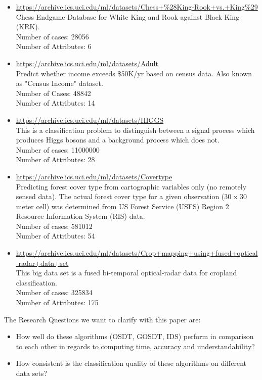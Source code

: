 \documentclass[preprint,a4paper]{sig-alternate-xt}
\begin{document}
\begin{itemize}
    \item \url{https://archive.ics.uci.edu/ml/datasets/Chess+\%28King-Rook+vs.+King\%29}\\
    Chess Endgame Database for White King and Rook against Black King (KRK).\\
    Number of cases: 28056\\
    Number of Attributes: 6
    \item \url{https://archive.ics.uci.edu/ml/datasets/Adult}\\
    Predict whether income exceeds \$50K/yr based on census data. Also known as "Census Income" dataset.\\
    Number of Cases: 48842\\
    Number of Attributes: 14
    \item \url{https://archive.ics.uci.edu/ml/datasets/HIGGS}\\
    This is a classification problem to distinguish between a signal process which produces Higgs bosons and a background process which does not.\\
    Number of cases: 11000000\\
    Number of Attributes: 28
    \item \url{https://archive.ics.uci.edu/ml/datasets/Covertype}\\
    Predicting forest cover type from cartographic variables only (no remotely sensed data). The actual forest cover type for a given observation (30 x 30 meter cell) was determined from US Forest Service (USFS) Region 2 Resource Information System (RIS) data.\\
    Number of cases: 581012\\
    Number of Attributes: 54
    \item \url{https://archive.ics.uci.edu/ml/datasets/Crop+mapping+using+fused+optical-radar+data+set}\\
    This big data set is a fused bi-temporal optical-radar data for cropland classification.\\
    Number of cases: 325834\\
    Number of Attributes: 175
\end{itemize}
The Research Questions we want to clarify with this paper are:
\begin{itemize}
    \item How well do these algorithms (OSDT, GOSDT, IDS) perform in comparison to each other in regards to computing time, accuracy and understandability?
    \item How consistent is the classification quality of these algorithms on different data sets?
\end{itemize}
\end{document}
